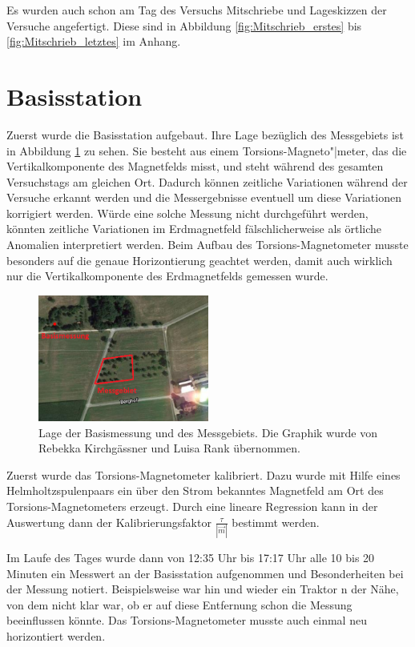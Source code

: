 Es wurden auch schon am Tag des Versuchs Mitschriebe und Lageskizzen der Versuche angefertigt. Diese sind in Abbildung \ref{fig:Mitschrieb_erstes} bis \ref{fig:Mitschrieb_letztes} im Anhang. 

\section{Basisstation}

Zuerst wurde die Basisstation aufgebaut. Ihre Lage bezüglich des Messgebiets ist in Abbildung \ref{fig:LageBasis} zu sehen. Sie besteht aus einem Torsions-Magneto"|meter, das die Vertikalkomponente des Magnetfelds misst, und steht während des gesamten Versuchstags am gleichen Ort. Dadurch können zeitliche Variationen während der Versuche erkannt werden und die Messergebnisse eventuell um diese Variationen korrigiert werden. Würde eine solche Messung nicht durchgeführt werden, könnten zeitliche Variationen im Erdmagnetfeld fälschlicherweise als örtliche Anomalien interpretiert werden. Beim Aufbau des Torsions-Magnetometer musste besonders auf die genaue Horizontierung geachtet werden, damit auch wirklich nur die Vertikalkomponente des Erdmagnetfelds gemessen wurde.

\begin{figure}[!ht]
 \centering
 \includegraphics[width=0.5\textwidth]{fig/Basismessunggps}
 \caption[Lage der Basismessung und des Messgebiets]{Lage der Basismessung und des Messgebiets. Die Graphik wurde von Rebekka Kirchgässner und Luisa Rank übernommen.}
 \label{fig:LageBasis}
\end{figure}

Zuerst wurde das Torsions-Magnetometer kalibriert. Dazu wurde mit Hilfe eines Helmholtzspulenpaars ein über den Strom bekanntes Magnetfeld am Ort des Torsions-Magnetometers erzeugt. Durch eine lineare Regression kann in der Auswertung dann der Kalibrierungsfaktor $\frac{\tau}{|\vec{m}|}$ bestimmt werden.

Im Laufe des Tages wurde dann von 12:35 Uhr bis 17:17 Uhr alle 10 bis 20 Minuten ein Messwert an der Basisstation aufgenommen und Besonderheiten bei der Messung notiert. Beispielsweise war hin und wieder ein Traktor n der Nähe, von dem nicht klar war, ob er auf diese Entfernung schon  die Messung beeinflussen könnte. Das Torsions-Magnetometer musste auch einmal neu horizontiert werden.

